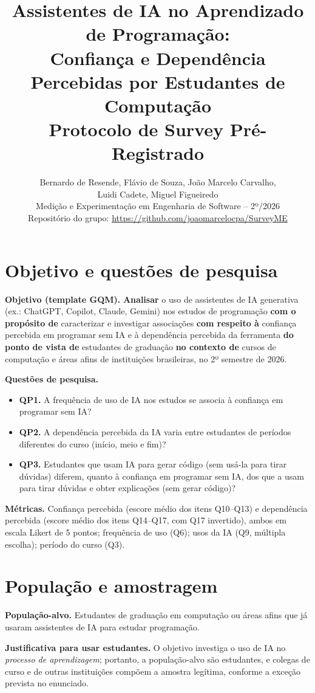 \documentclass[11pt,a4paper]{article}
\title{\textbf{Assistentes de IA no Aprendizado de Programação:\\
Confiança e Dependência Percebidas por Estudantes de Computação}\\[4pt]
\large Protocolo de Survey Pré-Registrado}
\author{Bernardo de Resende, Flávio de Souza, João Marcelo Carvalho,\\
Luidi Cadete, Miguel Figueiredo\\[4pt]
Medição e Experimentação em Engenharia de Software -- 2º/2026\\[2pt]
Repositório do grupo: \url{https://github.com/joaomarcelocpa/SurveyME}}
\date{}
\begin{document}
\maketitle

\section{Objetivo e questões de pesquisa}

\textbf{Objetivo (template GQM).}
\textbf{Analisar} o uso de assistentes de IA generativa (ex.: ChatGPT, Copilot, Claude, Gemini) nos estudos de programação
\textbf{com o propósito de} caracterizar e investigar associações
\textbf{com respeito à} confiança percebida em programar sem IA e à dependência percebida da ferramenta
\textbf{do ponto de vista de} estudantes de graduação
\textbf{no contexto de} cursos de computação e áreas afins de instituições brasileiras, no 2º semestre de 2026.

\textbf{Questões de pesquisa.}
\begin{itemize}
  \item \textbf{QP1.} A frequência de uso de IA nos estudos se associa à confiança em programar sem IA?
  \item \textbf{QP2.} A dependência percebida da IA varia entre estudantes de períodos diferentes do curso (início, meio e fim)?
  \item \textbf{QP3.} Estudantes que usam IA para gerar código (sem usá-la para tirar dúvidas) diferem, quanto à confiança em programar sem IA, dos que a usam para tirar dúvidas e obter explicações (sem gerar código)?
\end{itemize}

\textbf{Métricas.} Confiança percebida (escore médio dos itens Q10--Q13) e dependência percebida (escore médio dos itens Q14--Q17, com Q17 invertido), ambos em escala Likert de 5 pontos; frequência de uso (Q6); usos da IA (Q9, múltipla escolha); período do curso (Q3).

\section{População e amostragem}

\textbf{População-alvo.} Estudantes de graduação em computação ou áreas afins que já usaram assistentes de IA para estudar programação.

\textbf{Justificativa para usar estudantes.} O objetivo investiga o uso de IA no \emph{processo de aprendizagem}; portanto, a população-alvo são estudantes, e colegas de curso e de outras instituições compõem a amostra legítima, conforme a exceção prevista no enunciado.
\end{document}
